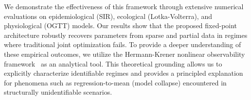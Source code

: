 We demonstrate the effectiveness of this framework through extensive numerical evaluations on epidemiological (SIR), ecological (Lotka-Volterra), and physiological (OGTT) models. 
Our results show that the proposed fixed-point architecture robustly recovers parameters from sparse and partial data in regimes where traditional joint optimization fails. 
To provide a deeper understanding of these empirical outcomes, we utilize the Hermann-Krener nonlinear observability framework~\cite{hermann2003nonlinear} as an analytical tool. 
This theoretical grounding allows us to explicitly characterize identifiable regimes and provides a principled explanation for phenomena such as regression-to-mean (model collapse) encountered in structurally unidentifiable scenarios.


